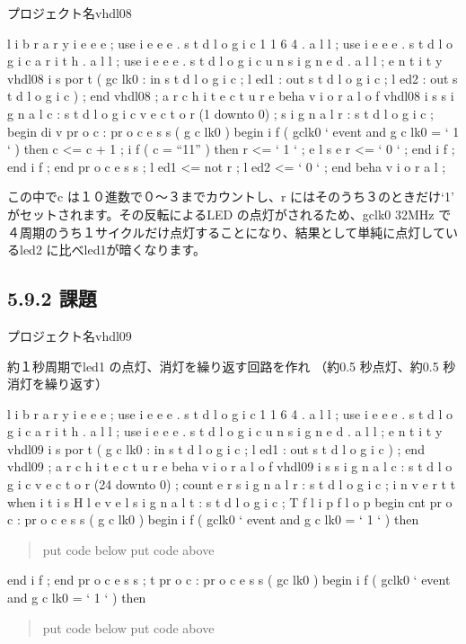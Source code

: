 \documentclass[letterpaper,10pt,dvipdfmx]{sphinxmanual}
\begin{document}
プロジェクト名vhdl08

l i b r a r y i e e e ;
use i e e e . s t d l o g i c 1 1 6 4 . a l l ;
use i e e e . s t d l o g i c a r i t h . a l l ;
use i e e e . s t d l o g i c u n s i g n e d . a l l ;
e n t i t y vhdl08 i s
por t (
gc lk0 : in s t d l o g i c ;
l ed1 : out s t d l o g i c ;
l ed2 : out s t d l o g i c
) ;
end vhdl08 ;
a r c h i t e c t u r e beha v i o r a l o f vhdl08 i s
s i g n a l c : s t d l o g i c v e c t o r (1 downto 0) ;
s i g n a l r : s t d l o g i c ;
begin
di v pr o c : pr o c e s s ( g c lk0 )
begin
i f ( gclk0 ` event and g c lk0 = ` 1 ` ) then
c \textless{}= c + 1 ;
i f ( c = ``11'' ) then
r \textless{}= ` 1 ` ;
e l s e
r \textless{}= ` 0 ` ;
end i f ;
end i f ;
end pr o c e s s ;
l ed1 \textless{}= not r ;
l ed2 \textless{}= ` 0 ` ;
end beha v i o r a l ;

この中でc は１０進数で０～３までカウントし、r にはそのうち３のときだけ`1' がセットされます。その反転によるLED の点灯がされるため、gclk0 32MHz で４周期のうち１サイクルだけ点灯することになり、結果として単純に点灯しているled2 に比べled1が暗くなります。


\subsection{5.9.2 課題}
\label{05_try:id16}
プロジェクト名vhdl09

約１秒周期でled1 の点灯、消灯を繰り返す回路を作れ
（約0.5 秒点灯、約0.5 秒消灯を繰り返す）

l i b r a r y i e e e ;
use i e e e . s t d l o g i c 1 1 6 4 . a l l ;
use i e e e . s t d l o g i c a r i t h . a l l ;
use i e e e . s t d l o g i c u n s i g n e d . a l l ;
e n t i t y vhdl09 i s
por t (
g c lk0 : in s t d l o g i c ;
l ed1 : out s t d l o g i c
) ;
end vhdl09 ;
a r c h i t e c t u r e beha v i o r a l o f vhdl09 i s
s i g n a l c : s t d l o g i c v e c t o r (24 downto 0) ;    count e r
s i g n a l r : s t d l o g i c ;    i n v e r t t when i t i s H l e v e l
s i g n a l t : s t d l o g i c ;    T f l i p f l o p
begin
cnt pr o c : pr o c e s s ( g c lk0 )
begin
i f ( gclk0 ` event and g c lk0 = ` 1 ` ) then
\begin{quote}

put code below
put code above
\end{quote}

end i f ;
end pr o c e s s ;
t pr o c : pr o c e s s ( gc lk0 )
begin
i f ( gclk0 ` event and g c lk0 = ` 1 ` ) then
\begin{quote}

put code below
put code above
\end{quote}
\end{document}
